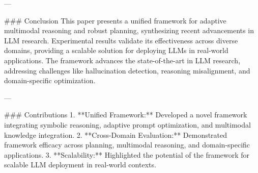 ---

### Conclusion
This paper presents a unified framework for adaptive multimodal reasoning and robust planning, synthesizing recent advancements in LLM research. Experimental results validate its effectiveness across diverse domains, providing a scalable solution for deploying LLMs in real-world applications. The framework advances the state-of-the-art in LLM research, addressing challenges like hallucination detection, reasoning misalignment, and domain-specific optimization.

---

### Contributions
1. **Unified Framework:** Developed a novel framework integrating symbolic reasoning, adaptive prompt optimization, and multimodal knowledge integration.
2. **Cross-Domain Evaluation:** Demonstrated framework efficacy across planning, multimodal reasoning, and domain-specific applications.
3. **Scalability:** Highlighted the potential of the framework for scalable LLM deployment in real-world contexts.

